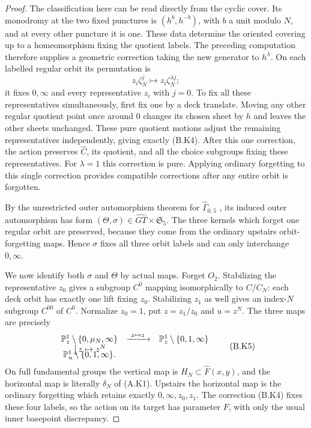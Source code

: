 \begin{proof}
The classification here can be read directly from the cyclic
cover.  Its monodromy at the two fixed punctures is $(h^b,h^{-b})$,
with $b$ a unit modulo $N$, and at every other puncture it is one.
These data determine the oriented covering up to a homeomorphism
fixing the quotient labels.  The preceding computation therefore
supplies a geometric correction taking the new generator to
$h^\lambda$.  On each labelled regular orbit its permutation is
\[
             z_i\zeta_N^j\longmapsto z_i\zeta_N^{\lambda j};
                                                               \tag{B.K4}
\]
it fixes $0,\infty$ and every representative $z_i$ with $j=0$.
To fix all these representatives simultaneously, first fix one by a
deck translate.  Moving any other regular quotient point once around
$0$ changes its chosen sheet by $h$ and leaves the other sheets
unchanged.  These pure quotient motions adjust the remaining
representatives independently, giving exactly (B.K4).
After this one correction, the action preserves $\widehat C$, its
quotient, and all the choice subgroups fixing these representatives.
For $\lambda=1$ this correction is pure.  Applying ordinary
forgetting to this single correction provides compatible
corrections after any entire orbit is forgotten.

By the unrestricted outer automorphism theorem for
$\widehat\Gamma_{0,5}$
\cite[Corollary 2.8]{CA_HMM}, its induced outer automorphism has
form $(\Theta,\sigma)\in\widehat{GT}\times\mathfrak S_5$.
The three kernels which forget one regular orbit are preserved,
because they come from the ordinary upstairs orbit-forgetting
maps.  Hence $\sigma$ fixes all three orbit labels and can only
interchange $0,\infty$.

We now identify both $\sigma$ and $\Theta$ by actual maps.  Forget
$O_2$.  Stabilizing the representative $z_0$ gives a subgroup
$C^0$ mapping isomorphically to $C/C_N$: each deck orbit has
exactly one lift fixing $z_0$.  Stabilizing $z_1$ as well gives an
index-$N$ subgroup $C^{00}$ of $C^0$.  Normalize $z_0=1$, put
$z=z_1/z_0$ and $u=z^N$.  The three maps are precisely
\[
 \begin{array}{ccc}
 \mathbb P^1_z\setminus\{0,\mu_N,\infty\}
       &\xrightarrow{\ z\mapsto z\ }&
           \mathbb P^1_z\setminus\{0,1,\infty\}\\
 \big\downarrow {z\mapsto z^N}&&\\[-2mm]
 \mathbb P^1_u\setminus\{0,1,\infty\}.&&
 \end{array}                                                   \tag{B.K5}
\]
On full fundamental groups the vertical map is $H_N\subset
\widehat F(x,y)$, and the horizontal map is literally $\delta_N$
of (A.K1).  Upstairs the horizontal map is the ordinary forgetting
which retains exactly $0,\infty,z_0,z_1$.  The correction (B.K4)
fixes these four labels, so the action on its target has parameter
$F$, with only the usual inner basepoint discrepancy.


\end{proof}
